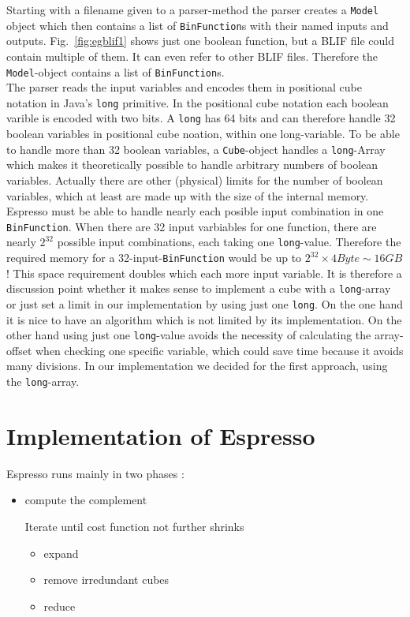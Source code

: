 \documentclass[colorback,accentcolor=tud1c,11pt]{tudreport}
\newcommand\code[1]{\texttt{#1}}
\begin{document}
  Starting with a filename given to a parser-method the parser creates a \code{Model} object which then contains a list of \code{BinFunction}s with their named inputs and outputs. Fig.~\ref{fig:egblif1} shows just one boolean function, but a BLIF file could contain multiple of them. It can even refer to other BLIF files. Therefore the \code{Model}-object contains a list of \code{BinFunction}s.
  \\
  The parser reads the input variables and encodes them in positional cube notation in Java's \code{long} primitive. In the positional cube notation each boolean varible is encoded with two bits. A \code{long} has 64 bits and can therefore handle 32 boolean variables in positional cube noation, within one long-variable. To be able to handle more than 32 boolean variables, a \code{Cube}-object handles a \code{long}-Array which makes it theoretically possible to handle arbitrary numbers of boolean variables. Actually there are other (physical) limits for the number of boolean variables, which at least are made up with the size of the internal memory.
  \\
  Espresso must be able to handle nearly each posible input combination in one \code{BinFunction}. When there are 32 input varbiables for one function, there are nearly $2^{32}$ possible input combinations, each taking one \code{long}-value. Therefore the required memory for a 32-input-\code{BinFunction} would be up to $2^{32} \times 4 Byte \sim 16 GB$! This space requirement doubles which each more input variable. It is therefore a discussion point whether it makes sense to implement a cube with a \code{long}-array or just set a limit in our implementation by using just one \code{long}. On the one hand it is nice to have an algorithm which is not limited by its implementation. On the other hand using just one \code{long}-value avoids the necessity of calculating the array-offset when checking one specific variable, which could save time because it avoids many divisions. In our implementation we decided for the first approach, using the \code{long}-array.
  

  \chapter{Implementation of Espresso}
  Espresso runs mainly in two phases \cite{micheli2003synthesis}:
  \begin{itemize}
  	\item{compute the complement}
	\begin{item}
		Iterate until cost function not further shrinks
		\begin{itemize}
			\item{expand}
			\item{remove irredundant cubes}
			\item{reduce}
		\end{itemize}
	\end{item}
  \end{itemize}
\end{document}
